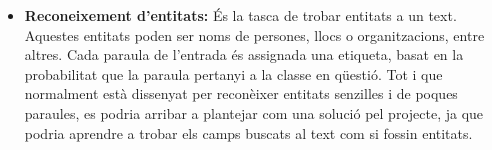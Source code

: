 \begin{itemize}
    \item \textbf{Reconeixement d'entitats:} És la tasca de trobar entitats a un text. Aquestes entitats poden ser noms de persones, llocs o organitzacions, entre altres. Cada paraula de l'entrada és assignada una etiqueta, basat en la probabilitat que la paraula pertanyi a la classe en qüestió. Tot i que normalment està dissenyat per reconèixer entitats senzilles i de poques paraules, es podria arribar a plantejar com una solució pel projecte, ja que podria aprendre a trobar els camps buscats al text com si fossin entitats.
\end{itemize}
